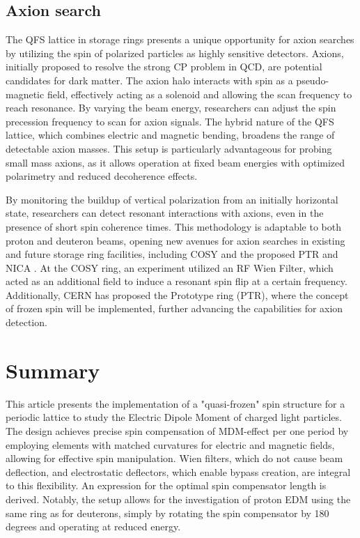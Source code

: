 \documentclass[submitting]{nst}
\begin{document}
\subsection{Axion search}

\par The QFS lattice in storage rings presents a unique opportunity for axion searches by utilizing the spin of polarized particles as highly sensitive detectors. Axions, initially proposed to resolve the strong CP problem in QCD, are potential candidates for dark matter. The axion halo interacts with spin as a pseudo-magnetic field, effectively acting as a solenoid and allowing the scan frequency to reach resonance. By varying the beam energy, researchers can adjust the spin precession frequency to scan for axion signals. The hybrid nature of the QFS lattice, which combines electric and magnetic bending, broadens the range of detectable axion masses. This setup is particularly advantageous for probing small mass axions, as it allows operation at fixed beam energies with optimized polarimetry and reduced decoherence effects.

\par By monitoring the buildup of vertical polarization from an initially horizontal state, researchers can detect resonant interactions with axions, even in the presence of short spin coherence times. This methodology is adaptable to both proton and deuteron beams, opening new avenues for axion searches in existing and future storage ring facilities, including COSY \cite{COSY} and the proposed PTR \cite{PTR} and NICA \cite{Axion}. At the COSY ring, an experiment utilized an RF Wien Filter, which acted as an additional field to induce a resonant spin flip at a certain frequency. Additionally, CERN has proposed the Prototype ring (PTR), where the concept of frozen spin will be implemented, further advancing the capabilities for axion detection.

\section{Summary} \label{sec.V}

\par This article presents the implementation of a "quasi-frozen" spin structure for a periodic lattice to study the Electric Dipole Moment of charged light particles. The design achieves precise spin compensation of MDM-effect per one period by employing elements with matched curvatures for electric and magnetic fields, allowing for effective spin manipulation. Wien filters, which do not cause beam deflection, and electrostatic deflectors, which enable bypass creation, are integral to this flexibility. An expression for the  optimal spin compensator length is derived. Notably, the setup allows for the investigation of proton EDM using the same ring as for deuterons, simply by rotating the spin compensator by 180 degrees and operating at reduced energy.
\end{document}
